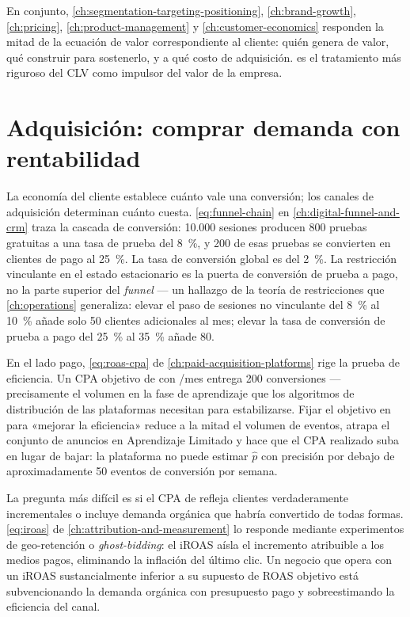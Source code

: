En conjunto, \cref{ch:segmentation-targeting-positioning}, \cref{ch:brand-growth},
\cref{ch:pricing}, \cref{ch:product-management} y \cref{ch:customer-economics} responden la
mitad de la ecuación de valor correspondiente al cliente: quién genera  de valor,
qué construir para sostenerlo, y a qué costo de adquisición.
\textcite{gupta2004customer} es el tratamiento más riguroso del CLV como impulsor del valor de
la empresa.

\section{Adquisición: comprar demanda con rentabilidad}\label{sec:capstone-acquisition}

La economía del cliente establece cuánto vale una conversión; los canales de adquisición
determinan cuánto cuesta. \cref{eq:funnel-chain} en \cref{ch:digital-funnel-and-crm} traza la
cascada de conversión: 10.000 sesiones producen 800 pruebas gratuitas a una tasa de prueba del
\qty{8}{\percent}, y 200 de esas pruebas se convierten en clientes de pago al \qty{25}{\percent}.
La tasa de conversión global es del \qty{2}{\percent}. La restricción vinculante en el estado
estacionario es la puerta de conversión de prueba a pago, no la parte superior del \emph{funnel}
--- un hallazgo de la teoría de restricciones que \cref{ch:operations} generaliza: elevar el paso
de sesiones no vinculante del \qty{8}{\percent} al \qty{10}{\percent} añade solo 50 clientes
adicionales al mes; elevar la tasa de conversión de prueba a pago del \qty{25}{\percent} al
\qty{35}{\percent} añade 80.

En el lado pago, \cref{eq:roas-cpa} de \cref{ch:paid-acquisition-platforms} rige la prueba de
eficiencia. Un CPA objetivo de  con /mes entrega 200 conversiones ---
precisamente el volumen en la fase de aprendizaje que los algoritmos de distribución de las
plataformas necesitan para estabilizarse. Fijar el objetivo en  para «mejorar la
eficiencia» reduce a la mitad el volumen de eventos, atrapa el conjunto de anuncios en Aprendizaje
Limitado y hace que el CPA realizado suba en lugar de bajar: la plataforma no puede estimar
\(\hat{p}\) con precisión por debajo de aproximadamente 50 eventos de conversión por semana.

La pregunta más difícil es si el CPA de  refleja clientes verdaderamente incrementales
o incluye demanda orgánica que habría convertido de todas formas. \cref{eq:iroas} de
\cref{ch:attribution-and-measurement} lo responde mediante experimentos de geo-retención o
\emph{ghost-bidding}: el iROAS aísla el incremento atribuible a los medios pagos, eliminando la
inflación del último clic. Un negocio que opera con un iROAS sustancialmente inferior a su
supuesto de ROAS objetivo está subvencionando la demanda orgánica con presupuesto pago y
sobreestimando la eficiencia del canal.

